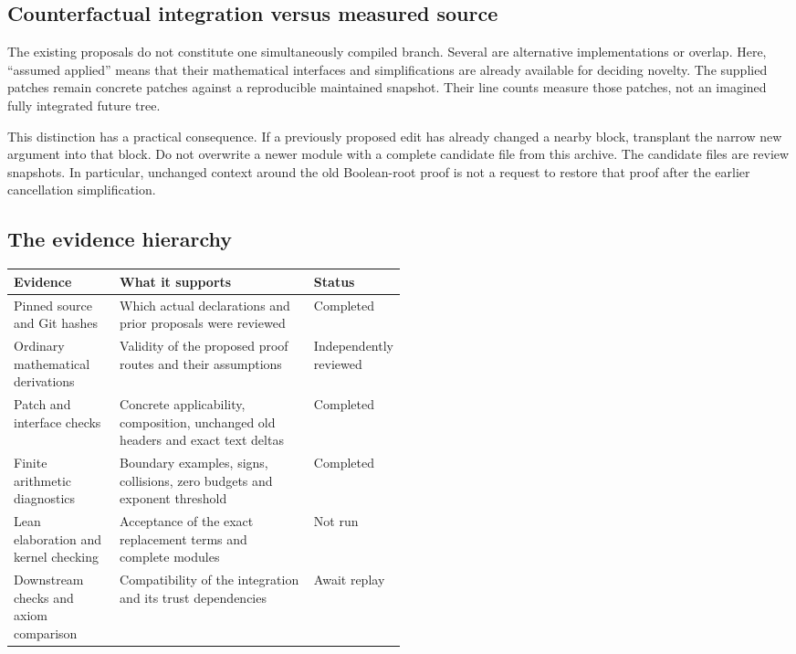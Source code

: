 \documentclass[11pt,letterpaper]{article}
\begin{document}
\subsection{Counterfactual integration versus measured source}

The existing proposals do not constitute one simultaneously compiled branch. Several are alternative implementations or overlap. Here, ``assumed applied'' means that their mathematical interfaces and simplifications are already available for deciding novelty. The supplied patches remain concrete patches against a reproducible maintained snapshot. Their line counts measure those patches, not an imagined fully integrated future tree.

This distinction has a practical consequence. If a previously proposed edit has already changed a nearby block, transplant the narrow new argument into that block. Do not overwrite a newer module with a complete candidate file from this archive. The candidate files are review snapshots. In particular, unchanged context around the old Boolean-root proof is not a request to restore that proof after the earlier cancellation simplification.

\subsection{The evidence hierarchy}

\begin{tabularx}{\linewidth}{@{}>{\raggedright\arraybackslash}p{0.27\linewidth}X>{\raggedright\arraybackslash}p{0.23\linewidth}@{}}
\toprule
Evidence & What it supports & Status\\
\midrule
Pinned source and Git hashes & Which actual declarations and prior proposals were reviewed & Completed\\
Ordinary mathematical derivations & Validity of the proposed proof routes and their assumptions & Independently reviewed\\
Patch and interface checks & Concrete applicability, composition, unchanged old headers and exact text deltas & Completed\\
Finite arithmetic diagnostics & Boundary examples, signs, collisions, zero budgets and exponent threshold & Completed\\
Lean elaboration and kernel checking & Acceptance of the exact replacement terms and complete modules & Not run\\
Downstream checks and axiom comparison & Compatibility of the integration and its trust dependencies & Await replay\\
\bottomrule
\end{tabularx}
\end{document}
